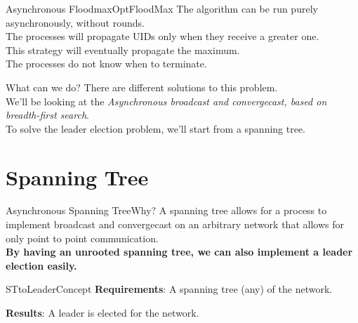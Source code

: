 \documentclass[pdf]{beamer}
\begin{document}
\begin{frame}{Asynchronous Floodmax}{OptFloodMax}
    The algorithm can be run purely asynchronously, without rounds.\\
    The processes will propagate UIDs only when they receive a greater one.\\
    \pause
    \vspace{12pt}
    This strategy will eventually propagate the maximum.\\
    \pause
    \vspace{12pt}
    The processes do not know when to terminate.
\end{frame}

\begin{frame}{What can we do?}
    There are different solutions to this problem.\\
    \vspace{12pt}
    We'll be looking at the \emph{Asynchronous broadcast and convergecast, based on breadth-first search}.\\
    \vspace{12pt}
    To solve the leader election problem, we'll start from a spanning tree.
\end{frame}

\section{Spanning Tree}
\begin{frame}{Asynchronous Spanning Tree}{Why?}
    A spanning tree allows for a process to implement broadcast and convergecast on
    an arbitrary network that allows for only point to point communication.\\
    \vspace{12pt}
    \textbf{By having an unrooted spanning tree, we can also implement a leader election 
    easily.}
\end{frame}

\begin{frame}{STtoLeader}{Concept}
    \textbf{Requirements}:
    A spanning tree (any) of the network.
    
    
    \vspace{12pt}
    \textbf{Results}:
    A leader is elected for the network.
\end{frame}
\end{document}
